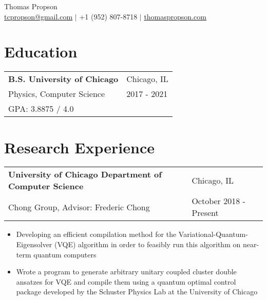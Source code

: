 \documentclass[letterpaper, 12pt]{article}
\begin{document}
\begin{center}
{\huge Thomas Propson} \\[5pt]
\href{mailto:tcpropson@gmail.com}{tcpropson@gmail.com} $\vert$
+1 (952) 807-8718 $\vert$
\href{https://thomaspropson.com}{thomaspropson.com}
\end{center}

\flushleft
\section{Education}
\vspace{10pt}
\begin{tabular}{@{} L{12cm} @{} R{4.51cm} @{}}
  \textbf{B.S. University of Chicago} & Chicago, IL \\
  Physics, Computer Science & 2017 - 2021 \\
  GPA: 3.8875 / 4.0 & \\
\end{tabular}

\section{Research Experience}
\vspace{10pt}
\begin{tabular}{@{} L{12cm} @{} R{4.51cm} @{}}
  \textbf{University of Chicago Department of Computer Science} & Chicago, IL \\
  Chong Group, Advisor: Frederic Chong & October 2018 - Present \\
\end{tabular}
\vspace{-10pt}
\begin{itemize}
  \item Developing an efficient compilation method for the Variational-Quantum-Eigensolver (VQE) algorithm in order to feasibly run this algorithm on near-term quantum computers
  \item Wrote a program to generate arbitrary unitary coupled cluster double ansatzes for VQE and compile them using a quantum optimal control package developed by the Schuster Physics Lab at the University of Chicago 
\end{itemize}
\end{document}
